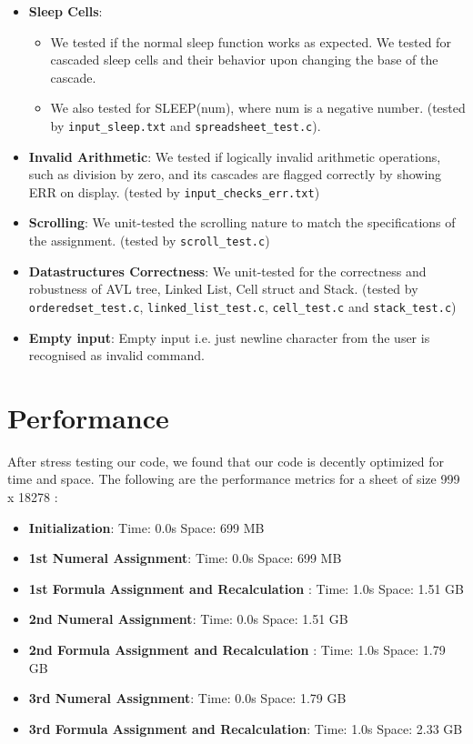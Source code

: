 \documentclass[10pt,a4paper]{article}  %
\begin{document}
\begin{itemize}
\begin{itemize}
    \end{itemize}
    \item \textbf{Sleep Cells}: 
    \begin{itemize}
        \item We tested if the normal sleep function works as expected. We tested for cascaded sleep cells and their behavior upon changing the base of the cascade. 
        \item We also tested for SLEEP(num), where num is a negative number. (tested by \texttt{input\_sleep.txt} and \texttt{spreadsheet\_test.c}).
    \end{itemize}
    \item \textbf{Invalid Arithmetic}: We tested if logically invalid arithmetic operations, such as division by zero, and its cascades are flagged correctly by showing ERR on display. (tested by \texttt{input\_checks\_err.txt})
    \item \textbf{Scrolling}: We unit-tested the scrolling nature to match the specifications of the assignment. (tested by \texttt{scroll\_test.c})
    \item \textbf{Datastructures Correctness}: We unit-tested for the correctness and robustness of AVL tree, Linked List, Cell struct and Stack. (tested by \texttt{orderedset\_test.c}, \texttt{linked\_list\_test.c}, \texttt{cell\_test.c} and \texttt{stack\_test.c})
    \item \textbf{Empty input}: Empty input i.e. just newline character from the user is recognised as invalid command.
\end{itemize}

\section{Performance}
After stress testing our code, we found that our code is decently optimized for time and space. The following are the performance metrics for a sheet of size 999 x 18278 :

\begin{itemize}
    \item \textbf{Initialization}: Time: 0.0s Space: 699 MB
    \item \textbf{1st Numeral Assignment}: Time: 0.0s Space: 699 MB
    \item \textbf{1st Formula Assignment and Recalculation }: Time: 1.0s Space: 1.51 GB
    \item \textbf{2nd Numeral Assignment}: Time: 0.0s Space: 1.51 GB
    \item \textbf{2nd Formula Assignment and Recalculation }: Time: 1.0s Space: 1.79 GB
    \item \textbf{3rd Numeral Assignment}: Time: 0.0s Space: 1.79 GB
    \item \textbf{3rd Formula Assignment and Recalculation}: Time: 1.0s Space: 2.33 GB

    

\end{itemize}
\end{document}
